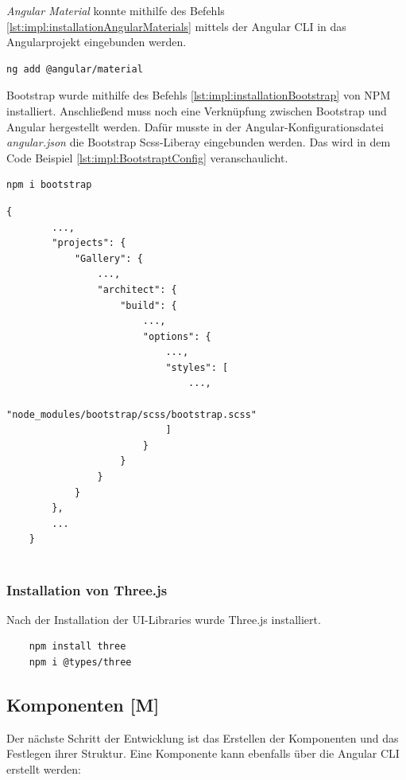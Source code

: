 \emph{Angular Material} konnte mithilfe des Befehls  \ref{lst:impl:installationAngularMaterials} mittels der Angular CLI in das Angularprojekt eingebunden werden.

\begin{lstlisting}[caption={{Terminal - Angular Material Installation}},language=bash,label=lst:impl:installationAngularMaterials]
    ng add @angular/material
\end{lstlisting}

Bootstrap wurde mithilfe des Befehls \ref{lst:impl:installationBootstrap} von NPM installiert.
Anschließend muss noch eine Verknüpfung zwischen Bootstrap und Angular hergestellt werden. Dafür musste in der Angular-Konfigurationsdatei \emph{angular.json} die Bootstrap Scss-Liberay eingebunden werden. Das wird in dem Code Beispiel \ref{lst:impl:BootstraptConfig} veranschaulicht.

\begin{lstlisting}[caption={{Terminal - Bootstrap Installation}},language=bash,label=lst:impl:installationBootstrap]
    npm i bootstrap
\end{lstlisting}

\begin{lstlisting}[caption={{angular.json - Bootstrap Angular Verknüpfung}},label=lst:impl:BootstraptConfig]
    {
        ...,
        "projects": {
            "Gallery": {
                ...,
                "architect": {
                    "build": {
                        ...,
                        "options": {
                            ...,
                            "styles": [
                                ...,
                                "node_modules/bootstrap/scss/bootstrap.scss"
                            ]
                        }
                    }
                }
            }
        },
        ...
    }
    
\end{lstlisting}


\subsubsection{Installation von Three.js}
Nach der Installation der UI-Libraries wurde Three.js installiert. 

\begin{lstlisting}
    npm install three
    npm i @types/three
\end{lstlisting}

\subsection{Komponenten [M]}
\label{components}
Der nächste Schritt der Entwicklung ist das Erstellen der Komponenten und das Festlegen ihrer Struktur. Eine Komponente kann ebenfalls über die Angular CLI erstellt werden:

